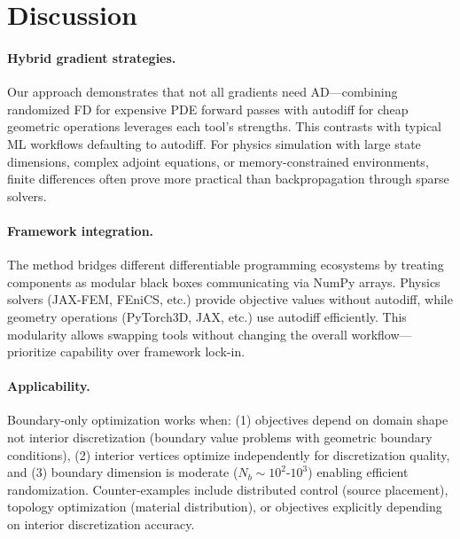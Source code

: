 \documentclass{article}
\begin{document}
\section{Discussion}

\paragraph{Hybrid gradient strategies.} Our approach demonstrates that not all gradients need AD—combining randomized FD for expensive PDE forward passes with autodiff for cheap geometric operations leverages each tool's strengths. This contrasts with typical ML workflows defaulting to autodiff. For physics simulation with large state dimensions, complex adjoint equations, or memory-constrained environments, finite differences often prove more practical than backpropagation through sparse solvers.

\paragraph{Framework integration.} The method bridges different differentiable programming ecosystems by treating components as modular black boxes communicating via NumPy arrays. Physics solvers (JAX-FEM, FEniCS, etc.) provide objective values without autodiff, while geometry operations (PyTorch3D, JAX, etc.) use autodiff efficiently. This modularity allows swapping tools without changing the overall workflow—prioritize capability over framework lock-in.

\paragraph{Applicability.} Boundary-only optimization works when: (1) objectives depend on domain shape not interior discretization (boundary value problems with geometric boundary conditions), (2) interior vertices optimize independently for discretization quality, and (3) boundary dimension is moderate ($N_b \sim 10^2$-$10^3$) enabling efficient randomization. Counter-examples include distributed control (source placement), topology optimization (material distribution), or objectives explicitly depending on interior discretization accuracy.
\end{document}
